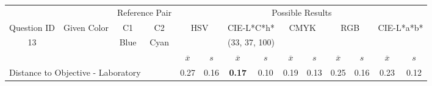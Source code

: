 \begin{table}[H]
  \resizebox{\textwidth}{!} {
  \begin{tabular}{lccccccccccccc}
    \hline
    \multicolumn{1}{c}{}                              &                                      & \multicolumn{2}{c}{Reference Pair}                   & \multicolumn{10}{c}{Possible Results}                                                                                                                                                                                                                                                                                        \\ \cline{3-14}
    \multicolumn{1}{c}{\multirow{-2}{*}{Question ID}} & \multirow{-2}{*}{Given Color}        & C1                       & C2                         & \multicolumn{2}{c}{HSV}                                        & \multicolumn{2}{c}{CIE-L*C*h*}                                 & \multicolumn{2}{c}{CMYK}                                       & \multicolumn{2}{c}{RGB}                                        & \multicolumn{2}{c}{CIE-L*a*b*}                                 \\ \hline
    \multicolumn{1}{c}{13}                             & \cellcolor[HTML]{0080FF}{\color[HTML]{FFFFFF}(26, 23, 98)} & \multicolumn{1}{c|}{Blue} & \multicolumn{1}{c|}{Cyan}  & \multicolumn{2}{c|}{\cellcolor[HTML]{0080FF}{\color[HTML]{FFFFFF}(26, 23, 98)}}      & \multicolumn{2}{c|}{\cellcolor[HTML]{00ACFF}(33, 37, 100)}       & \multicolumn{2}{c|}{\cellcolor[HTML]{0080FF}{\color[HTML]{FFFFFF}(26, 23, 98)}}       & \multicolumn{2}{c|}{\cellcolor[HTML]{0080FF}{\color[HTML]{FFFFFF}(26, 23, 98)}}       & \multicolumn{2}{c|}{\cellcolor[HTML]{5792FF}{\color[HTML]{FFFFFF}(32, 30, 99)}}       \\ \hline
                                                      & \multicolumn{1}{l}{}                 & \multicolumn{1}{l}{}     & \multicolumn{1}{l}{}       & \multicolumn{1}{c}{$\overline{x}$} & \multicolumn{1}{c}{$s$} & \multicolumn{1}{c}{$\overline{x}$} & \multicolumn{1}{c}{$s$} & \multicolumn{1}{c}{$\overline{x}$} & \multicolumn{1}{c}{$s$} & \multicolumn{1}{c}{$\overline{x}$} & \multicolumn{1}{c}{$s$} & \multicolumn{1}{c}{$\overline{x}$} & \multicolumn{1}{c}{$s$} \\ \hline
    \multicolumn{4}{l}{Distance to Objective - Laboratory}                                                                                           & \multicolumn{1}{|c}{0.27}       & \multicolumn{1}{c|}{0.16}    & \multicolumn{1}{|c}{\textbf{0.17}}       & \multicolumn{1}{c|}{0.10}    & \multicolumn{1}{|c}{0.19}       & \multicolumn{1}{c|}{0.13}    & \multicolumn{1}{|c}{0.25}       & \multicolumn{1}{c|}{0.16}    & \multicolumn{1}{|c}{0.23}       & \multicolumn{1}{c|}{0.12}    \\

\end{tabular}}
\end{table}
